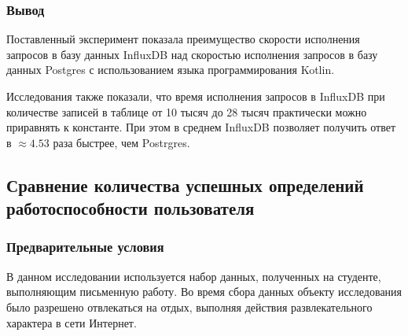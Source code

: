 \subsubsection*{Вывод}

Поставленный эксперимент показала преимущество скорости исполнения запросов в базу данных InfluxDB над скоростью исполнения запросов в базу данных Postgres с использованием языка программирования Kotlin.

Исследования также показали, что время исполнения запросов в InfluxDB при количестве записей в таблице от 10 тысяч до 28 тысяч практически можно приравнять к константе. При этом в среднем InfluxDB позволяет получить ответ в $\approx 4.53$ раза быстрее, чем Postrgres.

\subsection{Сравнение количества успешных определений работоспособности пользователя}

\subsubsection{Предварительные условия}

В данном исследовании используется набор данных, полученных на студенте, выполняющим письменную работу. Во время сбора данных объекту исследования было разрешено отвлекаться на отдых, выполняя действия развлекательного характера в сети Интернет.

\subsubsection{}

\pagebreak
